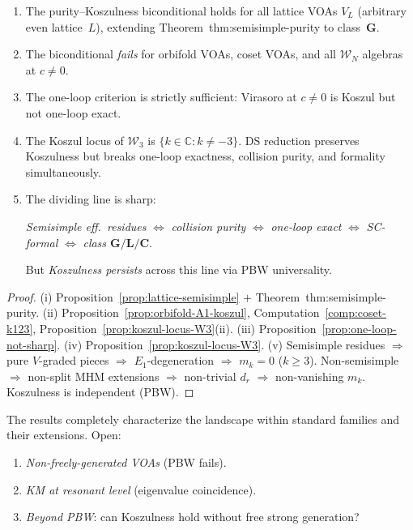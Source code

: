 \documentclass[11pt]{article}
\newcommand{\cW}{\mathcal{W}}
\newcommand{\C}{\mathbb{C}}
\begin{document}
\begin{theorem}
\label{thm:extended-purity-koszulness}
\begin{enumerate}[label=\textup{(\roman*)}]
\item The purity--Koszulness biconditional holds for all
  lattice VOAs $V_L$ \textup{(}arbitrary even lattice~$L$\textup{)},
  extending Theorem~thm:semisimple-purity to class~$\mathbf{G}$.
\item The biconditional \emph{fails} for orbifold VOAs,
  coset VOAs, and all $\cW_N$ algebras at $c \neq 0$.
\item The one-loop criterion is strictly sufficient:
  Virasoro at $c \neq 0$ is Koszul but not one-loop exact.
\item The Koszul locus of $\cW_3$ is
  $\{k \in \C : k \neq -3\}$.
  DS reduction preserves Koszulness but breaks one-loop
  exactness, collision purity, and formality simultaneously.
\item The dividing line is sharp:
  \begin{center}
  \emph{Semisimple eff.\ residues}
  $\Leftrightarrow$
  \emph{collision purity}
  $\Leftrightarrow$
  \emph{one-loop exact}
  $\Leftrightarrow$
  \emph{SC-formal}
  $\Leftrightarrow$
  \emph{class $\mathbf{G}/\mathbf{L}/\mathbf{C}$}.
  \end{center}
  But \emph{Koszulness persists} across this line
  via PBW universality.
\end{enumerate}
\end{theorem}

\begin{proof}
(i) Proposition~\ref{prop:lattice-semisimple} $+$
Theorem~thm:semisimple-purity.
(ii) Proposition~\ref{prop:orbifold-A1-koszul},
Computation~\ref{comp:coset-k123},
Proposition~\ref{prop:koszul-locus-W3}(ii).
(iii) Proposition~\ref{prop:one-loop-not-sharp}.
(iv) Proposition~\ref{prop:koszul-locus-W3}.
(v) Semisimple residues $\Rightarrow$ pure $V$-graded
pieces $\Rightarrow$ $E_1$-degeneration $\Rightarrow$
$m_k = 0$ ($k \geq 3$).  Non-semisimple $\Rightarrow$
non-split MHM extensions $\Rightarrow$ non-trivial $d_r$
$\Rightarrow$ non-vanishing $m_k$.  Koszulness is
independent (PBW).
\end{proof}

\begin{remark}
The results completely characterize the landscape within
standard families and their extensions.  Open:
\begin{enumerate}[label=(\alph*)]
\item \emph{Non-freely-generated VOAs} (PBW fails).
\item \emph{KM at resonant level} (eigenvalue coincidence).
\item \emph{Beyond PBW}: can Koszulness hold without free
  strong generation?
\end{enumerate}
\end{remark}
\end{document}

